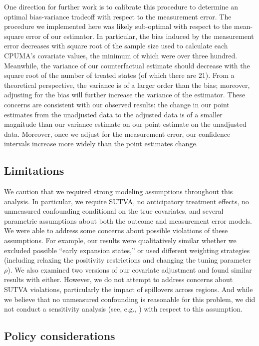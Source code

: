 \documentclass[aoas]{imsart}
\theoremstyle{plain}
\theoremstyle{remark}
\begin{document}
One direction for further work is to calibrate this procedure to determine an optimal bias-variance tradeoff with respect to the measurement error. The procedure we implemented here was likely sub-optimal with respect to the mean-square error of our estimator. In particular, the bias induced by the measurement error decreases with square root of the sample size used to calculate each CPUMA's covariate values, the minimum of which were over three hundred. Meanwhile, the variance of our counterfactual estimate should decrease with the square root of the number of treated states (of which there are 21). From a theoretical perspective, the variance is of a larger order than the bias; moreover, adjusting for the bias will further increase the variance of the estimator. These concerns are consistent with our observed results: the change in our point estimates from the unadjusted data to the adjusted data is of a smaller magnitude than our variance estimate on our point estimate on the unadjusted data. Moreover, once we adjust for the measurement error, our confidence intervals increase more widely than the point estimates change.

\subsection{Limitations}

We caution that we required strong modeling assumptions throughout this analysis. In particular, we require SUTVA, no anticipatory treatment effects, no unmeasured confounding conditional on the true covariates, and several parametric assumptions about both the outcome and measurement error models. We were able to address some concerns about possible violations of these assumptions. For example, our results were qualitatively similar whether we excluded possible ``early expansion states,'' or used different weighting strategies (including relaxing the positivity restrictions and changing the tuning parameter $\rho$). We also examined two versions of our covariate adjustment and found similar results with either. However, we do not attempt to address concerns about SUTVA violations, particularly the impact of spillovers across regions. And while we believe that no unmeasured confounding is reasonable for this problem, we did not conduct a sensitivity analysis (see, e.g., \cite{bonvini2021sensitivity}) with respect to this assumption.

\subsection{Policy considerations}
\end{document}
